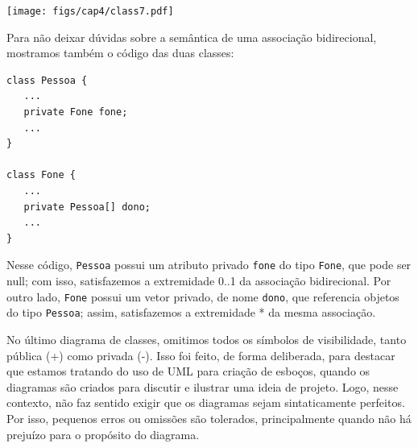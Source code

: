\documentclass[
  11pt,
  twoside]{book}
\newcommand{\passthrough}[1]{#1}
\begin{document}
\texttt{[image: figs/cap4/class7.pdf]}

Para não deixar dúvidas sobre a semântica de uma associação
bidirecional, mostramos também o código das duas classes:

\begin{lstlisting}
class Pessoa {
   ...
   private Fone fone;
   ...
}

class Fone {
   ...
   private Pessoa[] dono;
   ...
}
\end{lstlisting}

Nesse código, \passthrough{\lstinline!Pessoa!} possui um atributo
privado \passthrough{\lstinline!fone!} do tipo
\passthrough{\lstinline!Fone!}, que pode ser null; com isso,
satisfazemos a extremidade 0..1 da associação bidirecional. Por outro
lado, \passthrough{\lstinline!Fone!} possui um vetor privado, de nome
\passthrough{\lstinline!dono!}, que referencia objetos do tipo
\passthrough{\lstinline!Pessoa!}; assim, satisfazemos a extremidade * da
mesma associação.

No último diagrama de classes, omitimos todos os símbolos de
visibilidade, tanto pública (+) como privada (-). Isso foi feito, de
forma deliberada, para destacar que estamos tratando do uso de UML para
criação de esboços, quando os diagramas são criados para discutir e
ilustrar uma ideia de projeto. Logo, nesse contexto, não faz sentido
exigir que os diagramas sejam sintaticamente perfeitos. Por isso,
pequenos erros ou omissões são tolerados, principalmente quando não há
prejuízo para o propósito do diagrama.
\end{document}
